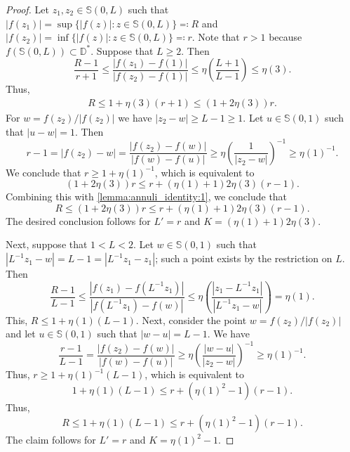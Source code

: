 \documentclass[letterpaper]{amsart}
\theoremstyle{plain}
\theoremstyle{definition}
\theoremstyle{remark}
\numberwithin{equation}{section}
\numberwithin{theorem}{section}
\newcommand{\D}{\mathbb D}
\begin{document}
\begin{proof}
Let $z_1,z_2\in \mathbb S(0,L)$ such that $|f(z_1)|=\sup\{|f(z)|:z\in \mathbb S(0,L)\}\eqqcolon R$ and $|f(z_2)|= \inf\{|f(z)|:z\in \mathbb S(0,L)\}\eqqcolon r$. Note that $r>1$ because $f(\mathbb S(0,L))\subset \D^*$. Suppose that $L\geq 2$. Then 
$$\frac{R-1}{r+1}\leq \frac{|f(z_1)-f(1)|}{|f(z_2)-f(1)|}\leq \eta\left(\frac{L+1}{L-1}\right)\leq \eta(3).$$
Thus, 
\begin{align}\label{lemma:annuli_identity:1}
R\leq 1+\eta(3)(r+1)\leq (1+2\eta(3))r.
\end{align}
For $w=f(z_2)/|f(z_2)|$ we have $|z_2-w|\geq L-1\geq 1$. Let $u\in \mathbb S(0,1)$ such that $|u-w|=1$. Then  
$$r-1=|f(z_2)-w|=\frac{|f(z_2)-f(w)|}{|f(w)-f(u)|} \geq {\eta\left(\frac{1}{|z_2-w|}\right)}^{-1} \geq {\eta(1)}^{-1}.$$ 
We conclude that $r\geq 1+{\eta(1)}^{-1}$, which is equivalent to 
$$(1+2\eta(3))r\leq r+(\eta(1)+1)2\eta(3)(r-1).$$ 
Combining this with \eqref{lemma:annuli_identity:1}, we conclude that 
$$R\leq (1+2\eta(3))r\leq  r+(\eta(1)+1)2\eta(3)(r-1).$$
The desired conclusion follows for $L'=r$ and $K=(\eta(1)+1)2\eta(3)$.

Next, suppose that $1<L<2$. Let $w\in  \mathbb S(0,1)$ such that $|L^{-1}z_1-w|=L-1=|L^{-1}z_1-z_1|$; such a point exists by the restriction on $L$. Then
$$\frac{R-1}{L-1}\leq   \frac{|f(z_1)-f(L^{-1}z_1)|}{|f(L^{-1}z_1)-f(w)|}\leq \eta\left( \frac{|z_1-L^{-1}z_1|}{|L^{-1}z_1-w|}\right)= \eta(1).$$
This, $R\leq 1+\eta(1)(L-1)$. Next, consider the point $w=f(z_2)/|f(z_2)|$ and let $u\in \mathbb S(0,1)$ such that $|w-u|=L-1$. We have
$$\frac{r-1}{L-1}=\frac{\left|f(z_2)- f(w)\right|}{|f(w)-f(u)|} \geq  {\eta\left(\frac{|w-u|}{|z_2-w|} \right)}^{-1}\geq {\eta(1)}^{-1}.$$
Thus, $r\geq 1+\eta(1)^{-1}(L-1)$, which is equivalent to $$1+\eta(1)(L-1)\leq r+ (\eta(1)^2-1)(r-1).$$
Thus, 
$$  R\leq 1+\eta(1)(L-1)\leq r+(\eta(1)^2-1)(r-1).$$
The claim follows for $L'=r$ and $K=\eta(1)^2-1$. 
\end{proof}
\end{document}
